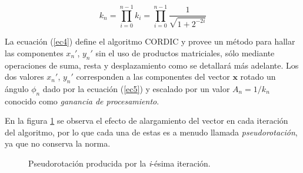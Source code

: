 \begin{equation}\label{eckn}
k_{n}= \prod_{i=0}^{n-1}k_{i}=\prod_{i=0}^{n-1} \displaystyle \frac{1}{\sqrt{1+2^{-2i}}}
\end{equation}

La ecuación (\ref{ec4}) define el algoritmo CORDIC y provee un método para hallar las componentes $x_{n}'$, $y_{n}'$
sin el uso de productos matriciales, sólo mediante operaciones de suma, resta y desplazamiento como se detallará más
adelante. Los dos valores $x_{n}'$, $y_{n}'$ corresponden a las componentes del vector $\mathbf{x}$ rotado un ángulo
$\phi_{n}$ dado por la ecuación (\ref{ec5}) y escalado por un valor $A_{n}=1/k_{n}$ conocido como \emph{ganancia de procesamiento}.

En la figura \ref{pseudorotacion} se observa el efecto de alargamiento del vector en cada iteración del algoritmo, por
lo que cada una de estas es a menudo llamada \emph{pseudorotación}, ya que no conserva la norma.

\begin{figure}[htpb]
\begin{center}
\caption{Pseudorotación producida por la \emph{i}-ésima iteración.}
\label{pseudorotacion}
\end{center}
\end{figure}

